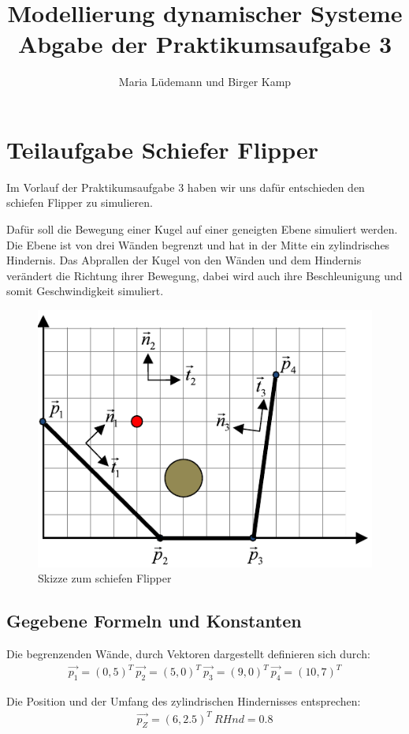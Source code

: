 \documentclass[]{scrartcl}
\title{Modellierung dynamischer Systeme  \\ Abgabe der Praktikumsaufgabe 3}
\author{Maria Lüdemann und Birger Kamp}
\begin{document}
\maketitle
\tableofcontents
\newpage


\section{Teilaufgabe Schiefer Flipper}
Im Vorlauf der Praktikumsaufgabe 3 haben wir uns dafür entschieden den schiefen Flipper zu simulieren.

Dafür soll die Bewegung einer Kugel auf einer geneigten Ebene simuliert werden. Die Ebene ist von drei Wänden begrenzt und hat in der Mitte ein zylindrisches Hindernis. Das Abprallen der Kugel von den Wänden und dem Hindernis verändert die Richtung ihrer Bewegung, dabei wird auch ihre Beschleunigung und somit Geschwindigkeit simuliert.

\begin{figure}[H]
	\centering
	\includegraphics[width=0.8\linewidth]{./skizze_schieferFlipper}
	\caption{Skizze zum schiefen Flipper}
	\label{fig:1_skizze_schieferFlipper}
\end{figure}

\subsection{Gegebene Formeln und Konstanten}
Die begrenzenden Wände, durch Vektoren dargestellt definieren sich durch:
\begin{align}
\vec{p_1} = (0,5)^T \ 
\vec{p_2} = (5,0)^T \ 
\vec{p_3} = (9,0)^T \ 
\vec{p_4} = (10,7)^T
\end{align}

Die Position und der Umfang des zylindrischen Hindernisses entsprechen:
\begin{align}
\vec{p_Z} = (6,2.5)^T \ 
RHnd = 0.8
\end{align}
\end{document}
